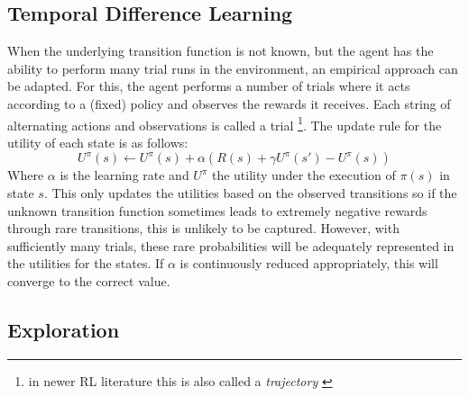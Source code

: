 \subsection{Temporal Difference Learning}%
\label{sub:temporal_difference_learning}

When the underlying transition function is not known, but the agent has the ability to perform many trial runs in the
environment, an empirical approach can be adapted. For this, the agent performs a number of trials where it acts
according to a (fixed) policy and observes the rewards it receives. Each string of alternating actions and observations
is called a trial
\footnote{in newer \ac{RL} literature this is also called a \emph{trajectory} \citep{proximalpolicyopt, heess2017emergence} }.
The update rule for the utility of each state is as follows:
\begin{equation}
    U^\pi(s) \gets U^\pi(s) + \alpha(R(s) + \gamma U^\pi(s') - U^\pi(s))
\end{equation}
Where $\alpha$ is the learning rate and $U^\pi$ the utility under the execution of $\pi(s)$ in state $s$. This only
updates the utilities based on the observed transitions so if the unknown transition function sometimes leads to
extremely negative rewards through rare transitions, this is unlikely to be captured. However, with sufficiently many
trials, these rare probabilities will be adequately represented in the utilities for the states. If $\alpha$ is
continuously reduced appropriately, this will converge to the correct value.

\subsection{Exploration}%
\label{sub:exploration}

